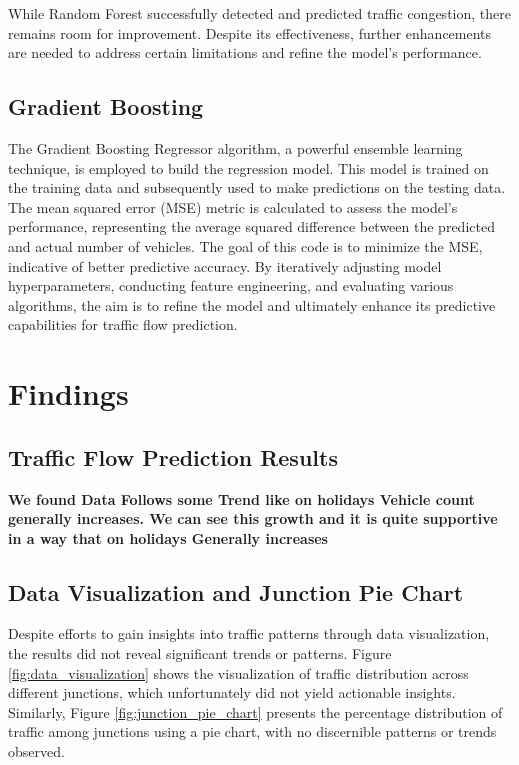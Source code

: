 \documentclass{IEEEtran}
\begin{document}
While Random Forest successfully detected and predicted traffic congestion, there remains room for improvement. Despite its effectiveness, further enhancements are needed to address certain limitations and refine the model's performance.

\subsection{Gradient Boosting}
The Gradient Boosting Regressor algorithm, a powerful ensemble learning technique, is employed to build the regression model. This model is trained on the training data and subsequently used to make predictions on the testing data. The mean squared error (MSE) metric is calculated to assess the model's performance, representing the average squared difference between the predicted and actual number of vehicles. The goal of this code is to minimize the MSE, indicative of better predictive accuracy. By iteratively adjusting model hyperparameters, conducting feature engineering, and evaluating various algorithms, the aim is to refine the model and ultimately enhance its predictive capabilities for traffic flow prediction.




\section{Findings}

\subsection{Traffic Flow Prediction Results}
\textbf{We found Data Follows some Trend like on holidays Vehicle count generally increases. We can see this growth and it is quite supportive in a way that on holidays Generally increases}

\subsection{Data Visualization and Junction Pie Chart}

Despite efforts to gain insights into traffic patterns through data visualization, the results did not reveal significant trends or patterns. Figure \ref{fig:data_visualization} shows the visualization of traffic distribution across different junctions, which unfortunately did not yield actionable insights. Similarly, Figure \ref{fig:junction_pie_chart} presents the percentage distribution of traffic among junctions using a pie chart, with no discernible patterns or trends observed.
\end{document}
